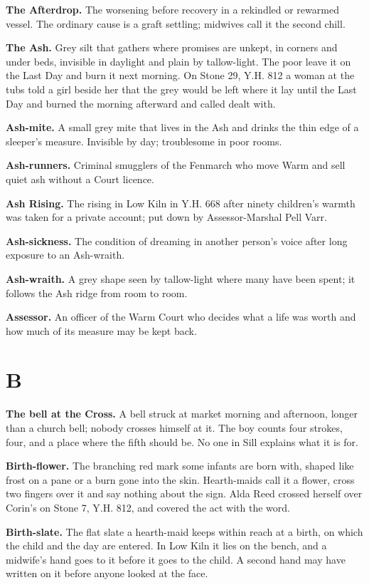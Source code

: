 \documentclass{design/chronicle}
\begin{document}
\textbf{The Afterdrop.} The worsening before recovery in a rekindled or rewarmed vessel. The ordinary cause is a graft settling; midwives call it the second chill.

\textbf{The Ash.} Grey silt that gathers where promises are unkept, in corners and under beds, invisible in daylight and plain by tallow-light. The poor leave it on the Last Day and burn it next morning. On Stone 29, Y.H. 812 a woman at the tubs told a girl beside her that the grey would be left where it lay until the Last Day and burned the morning afterward and called dealt with.

\textbf{Ash-mite.} A small grey mite that lives in the Ash and drinks the thin edge of a sleeper’s measure. Invisible by day; troublesome in poor rooms.

\textbf{Ash-runners.} Criminal smugglers of the Fenmarch who move Warm and sell quiet ash without a Court licence.

\textbf{Ash Rising.} The rising in Low Kiln in Y.H. 668 after ninety children’s warmth was taken for a private account; put down by Assessor-Marshal Pell Varr.

\textbf{Ash-sickness.} The condition of dreaming in another person’s voice after long exposure to an Ash-wraith.

\textbf{Ash-wraith.} A grey shape seen by tallow-light where many have been spent; it follows the Ash ridge from room to room.

\textbf{Assessor.} An officer of the Warm Court who decides what a life was worth and how much of its measure may be kept back.

\section*{B}

\textbf{The bell at the Cross.} A bell struck at market morning and afternoon, longer than a church bell; nobody crosses himself at it. The boy counts four strokes, four, and a place where the fifth should be. No one in Sill explains what it is for.

\textbf{Birth-flower.} The branching red mark some infants are born with, shaped like frost on a pane or a burn gone into the skin. Hearth-maids call it a flower, cross two fingers over it and say nothing about the sign. Alda Reed crossed herself over Corin’s on Stone 7, Y.H. 812, and covered the act with the word.

\textbf{Birth-slate.} The flat slate a hearth-maid keeps within reach at a birth, on which the child and the day are entered. In Low Kiln it lies on the bench, and a midwife’s hand goes to it before it goes to the child. A second hand may have written on it before anyone looked at the face.
\end{document}
